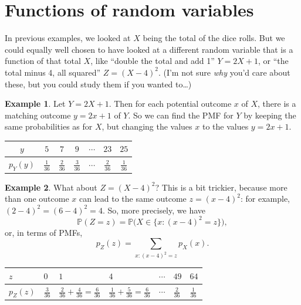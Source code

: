 \documentclass[
  a4paper,
]{book}
\theoremstyle{definition}
\theoremstyle{definition}
\newtheorem{example}{Example}[chapter]
\theoremstyle{definition}
\theoremstyle{definition}
\theoremstyle{remark}
\begin{document}
\hypertarget{functions}{%
\section{Functions of random variables}\label{functions}}

In previous examples, we looked at \(X\) being the total of the dice rolls. But we could equally well chosen to have looked at a different random variable that is a function of that total \(X\), like ``double the total and add 1'' \(Y = 2X + 1\), or ``the total minus 4, all squared'' \(Z = (X-4)^2\). (I'm not sure \emph{why} you'd care about these, but you could study them if you wanted to\ldots)

\begin{example}

Let \(Y = 2X + 1\). Then for each potential outcome \(x\) of \(X\), there is a matching outcome \(y = 2x +1\) of \(Y\). So we can find the PMF for \(Y\) by keeping the same probabilities as for \(X\), but changing the values \(x\) to the values \(y = 2x +1\).

\begin{longtable}[]{@{}ccccccc@{}}
\toprule
\(y\) & \(5\) & \(7\) & \(9\) & \(\cdots\) & \(23\) & \(25\) \\
\midrule
\endhead
\(p_Y(y)\) & \(\frac{1}{36}\) & \(\frac{2}{36}\) & \(\frac{3}{36}\) & \(\cdots\) & \(\frac{2}{36}\) & \(\frac{1}{36}\) \\
\bottomrule
\end{longtable}

\end{example}

\begin{example}

What about \(Z = (X - 4)^2\)? This is a bit trickier, because more than one outcome \(x\) can lead to the same outcome \(z = (x - 4)^2\): for example, \((2 - 4)^2 = (6 - 4)^2 = 4\). So, more precisely, we have
\[ \mathbb P(Z = z) = \mathbb P\big(X \in \{x : (x - 4)^2 = z\}\big) , \]
or, in terms of PMFs,
\[   p_Z(z) = \sum_{x : (x - 4)^2 = z} p_X(x) . \]

\begin{longtable}[]{@{}
  >{\centering\arraybackslash}p{}
  >{\centering\arraybackslash}p{}
  >{\centering\arraybackslash}p{}
  >{\centering\arraybackslash}p{}
  >{\centering\arraybackslash}p{}
  >{\centering\arraybackslash}p{}
  >{\centering\arraybackslash}p{}@{}}
\toprule
\(z\) & \(0\) & \(1\) & \(4\) & \(\cdots\) & \(49\) & \(64\) \\
\midrule
\endhead
\(p_Z(z)\) & \(\frac{3}{36}\) & \(\frac{2}{36} + \frac{4}{36} = \frac{6}{36}\) & \(\frac{1}{36} + \frac{5}{36} = \frac{6}{36}\) & \(\cdots\) & \(\frac{2}{36}\) & \(\frac{1}{36}\) \\
\bottomrule
\end{longtable}

\end{example}
\end{document}
